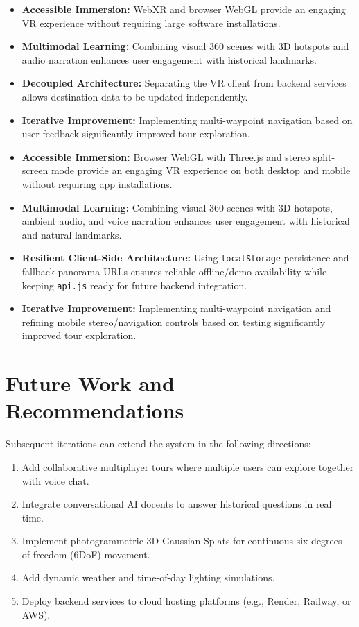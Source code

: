 \documentclass{tietreport}
\begin{document}
\begin{itemize}
  \item \textbf{Accessible Immersion:} WebXR and browser WebGL provide an engaging VR experience without requiring large software installations.
  \item \textbf{Multimodal Learning:} Combining visual 360 scenes with 3D hotspots and audio narration enhances user engagement with historical landmarks.
  \item \textbf{Decoupled Architecture:} Separating the VR client from backend services allows destination data to be updated independently.
  \item \textbf{Iterative Improvement:} Implementing multi-waypoint navigation based on user feedback significantly improved tour exploration.
  \item \textbf{Accessible Immersion:} Browser WebGL with Three.js and stereo split-screen mode provide an engaging VR experience on both desktop and mobile without requiring app installations.
  \item \textbf{Multimodal Learning:} Combining visual 360 scenes with 3D hotspots, ambient audio, and voice narration enhances user engagement with historical and natural landmarks.
  \item \textbf{Resilient Client-Side Architecture:} Using \texttt{localStorage} persistence and fallback panorama URLs ensures reliable offline/demo availability while keeping \texttt{api.js} ready for future backend integration.
  \item \textbf{Iterative Improvement:} Implementing multi-waypoint navigation and refining mobile stereo/navigation controls based on testing significantly improved tour exploration.
\end{itemize}

\section{Future Work and Recommendations}

Subsequent iterations can extend the system in the following directions:

\begin{enumerate}
  \item Add collaborative multiplayer tours where multiple users can explore together with voice chat.
  \item Integrate conversational AI docents to answer historical questions in real time.
  \item Implement photogrammetric 3D Gaussian Splats for continuous six-degrees-of-freedom (6DoF) movement.
  \item Add dynamic weather and time-of-day lighting simulations.
  \item Deploy backend services to cloud hosting platforms (e.g., Render, Railway, or AWS).
\end{enumerate}
\end{document}
